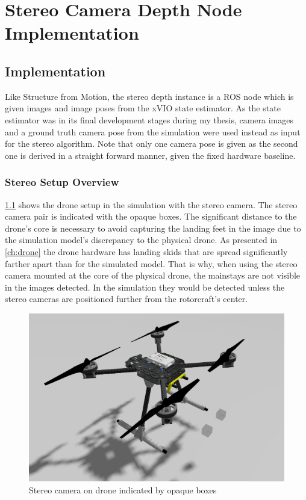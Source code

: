 \chapter{Stereo Camera Depth Node Implementation}
\label{chapter:stereo_camera_depth}

\section{Implementation}

Like Structure from Motion, the stereo depth instance is a ROS node which is given images and image poses from the xVIO state estimator. As the state estimator was in its final development stages during my thesis, camera images and a ground truth camera pose from the simulation were used instead as input for the stereo algorithm. Note that only one camera pose is given as the second one is derived in a straight forward manner, given the fixed hardware baseline.

\subsection{Stereo Setup Overview}

\cref{fig:drone_sim_setup} shows the drone setup in the simulation with the stereo camera. The stereo camera pair is indicated with the opaque boxes. The significant distance to the drone's core is necessary to avoid capturing the landing feet in the image due to the simulation model's discrepancy to the physical drone. As presented in \cref{ch:drone} the drone hardware has landing skids that are spread significantly farther apart than for the simulated model. That is why, when using the stereo camera mounted at the core of the physical drone, the mainstays are not visible in the images detected. In the simulation they would be detected unless the stereo cameras are positioned further from the rotorcraft's center. 

\begin{figure}
    \centering
    \includegraphics[scale=0.32]{images/preparation/stereo/drone_with_stereo_cam.png}
    \caption{Stereo camera on drone indicated by opaque boxes}
    \label{fig:drone_sim_setup}
\end{figure}

